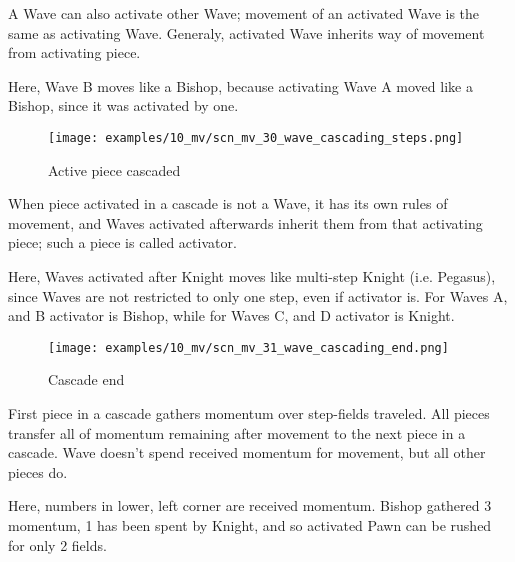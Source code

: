 A Wave can also activate other Wave; movement of an activated Wave is the same as
activating Wave. Generaly, activated Wave inherits way of movement from activating
piece.

Here, Wave B moves like a Bishop, because activating Wave A moved like a Bishop,
since it was activated by one.

\clearpage %

\vspace*{-2.1\baselineskip}
\noindent
\begin{figure}[h]
\texttt{[image: examples/10\_mv/scn\_mv\_30\_wave\_cascading\_steps.png]}
\vspace*{-1.4\baselineskip}
\caption{Active piece cascaded}
\label{fig:scn_mv_30_wave_cascading_steps}
\end{figure}

\vspace*{-0.4\baselineskip}
When piece activated in a cascade is not a Wave, it has its own rules of movement, and
Waves activated afterwards inherit them from that activating piece; such a piece is
called activator.

Here, Waves activated after Knight moves like multi-step Knight (i.e. Pegasus), since
Waves are not restricted to only one step, even if activator is. For Waves A, and B
activator is Bishop, while for Waves C, and D activator is Knight.

\clearpage %

\vspace*{-2.1\baselineskip}
\noindent
\begin{figure}[h]
\texttt{[image: examples/10\_mv/scn\_mv\_31\_wave\_cascading\_end.png]}
\vspace*{-1.3\baselineskip}
\caption{Cascade end}
\label{fig:scn_mv_31_wave_cascading_end}
\end{figure}

\vspace*{-0.3\baselineskip}
First piece in a cascade gathers momentum over step-fields traveled. All pieces
transfer all of momentum remaining after movement to the next piece in a cascade.
Wave doesn't spend received momentum for movement, but all other pieces do.

Here, numbers in lower, left corner are received momentum. Bishop gathered 3 momentum,
1 has been spent by Knight, and so activated Pawn can be rushed for only 2 fields.

